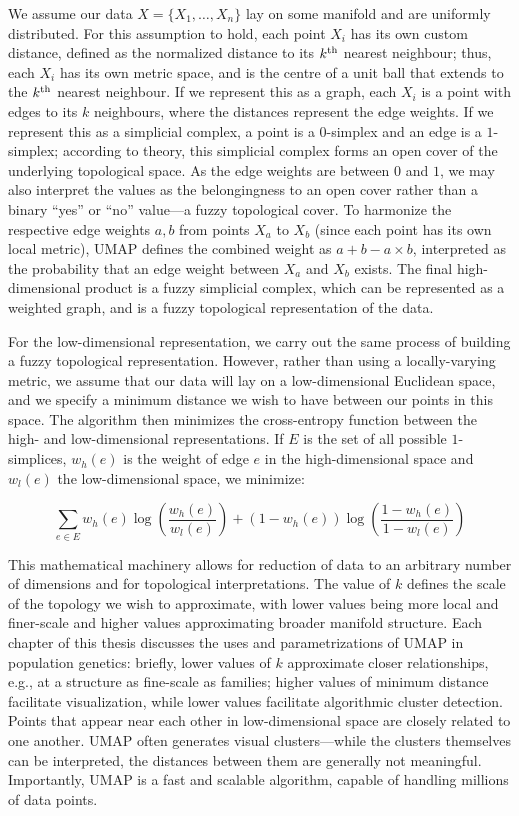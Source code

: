We assume our data $X = \{X_{1}, \dots, X_{n}\}$ lay on some manifold and are uniformly distributed. For this assumption to hold, each point $X_{i}$ has its own custom distance, defined as the normalized distance to its $k\textsuperscript{th}$ nearest neighbour; thus, each $X_{i}$ has its own metric space, and is the centre of a unit ball that extends to the $k\textsuperscript{th}$ nearest neighbour. If we represent this as a graph, each $X_i$ is a point with edges to its $k$ neighbours, where the distances represent the edge weights. If we represent this as a simplicial complex, a point is a $0$-simplex and an edge is a $1$-simplex; according to theory, this simplicial complex forms an open cover of the underlying topological space. As the edge weights are between $0$ and $1$, we may also interpret the values as the belongingness to an open cover rather than a binary ``yes'' or ``no'' value---a fuzzy topological cover. To harmonize the respective edge weights $a, b$ from points $X_{a}$ to $X_{b}$ (since each point has its own local metric), UMAP defines the combined weight as $a + b - a \times b$, interpreted as the probability that an edge weight between $X_{a}$ and $X_{b}$ exists. The final high-dimensional product is a fuzzy simplicial complex, which can be represented as a weighted graph, and is a fuzzy topological representation of the data.

For the low-dimensional representation, we carry out the same process of building a fuzzy topological representation. However, rather than using a locally-varying metric, we assume that our data will lay on a low-dimensional Euclidean space, and we specify a minimum distance we wish to have between our points in this space. The algorithm then minimizes the cross-entropy function between the high- and low-dimensional representations. If $E$ is the set of all possible $1$-simplices, $w_{h}(e)$ is the weight of edge $e$ in the high-dimensional space and $w_{l}(e)$ the low-dimensional space, we minimize:

$$ \sum_{e \in E} w_{h}(e) \log{\left(\frac{w_{h}(e)}{w_{l}(e)}\right)} + (1 - w_{h}(e)) \log{\left(\frac{1 - w_{h}(e)}{1 - w_{l}(e)}\right)} $$

This mathematical machinery allows for reduction of data to an arbitrary number of dimensions and for topological interpretations. The value of $k$ defines the scale of the topology we wish to approximate, with lower values being more local and finer-scale and higher values approximating broader manifold structure. Each chapter of this thesis discusses the uses and parametrizations of UMAP in population genetics: briefly, lower values of $k$ approximate closer relationships, e.g., at a structure as fine-scale as families; higher values of minimum distance facilitate visualization, while lower values facilitate algorithmic cluster detection. Points that appear near each other in low-dimensional space are closely related to one another. UMAP often generates visual clusters---while the clusters themselves can be interpreted, the distances between them are generally not meaningful. Importantly, UMAP is a fast and scalable algorithm, capable of handling millions of data points.

